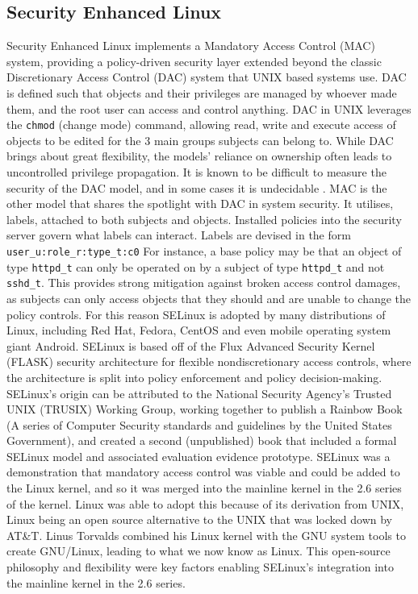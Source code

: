 \documentclass[11pt,titlepage,dvipsnames,table,xcdraw]{article}
\begin{document}
\subsection{Security Enhanced Linux}
Security Enhanced Linux implements a Mandatory Access Control (MAC) system, providing a policy-driven security layer extended beyond the classic
Discretionary Access Control (DAC) system that UNIX based systems use. DAC is defined such that objects and their privileges are managed by whoever made them, and the root user can access and 
control anything. DAC in UNIX leverages the \verb_chmod_ (change mode) command, allowing read, write and execute access of objects to be edited for the 3 main groups subjects can belong to. While DAC brings about great
flexibility, the models' reliance on ownership often leads to uncontrolled privilege propagation. It is known to be difficult to measure the security of the DAC model, and in some cases it is undecidable \cite{fan_mandatory_2009}. 
MAC is the other model that shares the spotlight with DAC in system security. It utilises, labels, attached to both subjects and objects. Installed policies into the security server govern what labels can interact.
Labels are devised in the form \verb|user_u:role_r:type_t:c0|
For instance, a base policy may be that an object of type \verb|httpd_t| can only be operated on by a subject of 
type \verb|httpd_t| and not \verb|sshd_t|. This provides strong mitigation against
broken access control damages, as subjects can only access objects that they should and are unable to change the policy controls. For this reason SELinux is adopted by many distributions of Linux, including Red Hat,
Fedora, CentOS and even mobile operating system giant Android. SELinux is based off of the Flux Advanced Security Kernel (FLASK) security architecture for flexible
nondiscretionary access controls, where the architecture is split into policy enforcement and policy decision-making. 
SELinux's origin can be attributed to the National Security Agency's Trusted UNIX (TRUSIX) Working Group, working together to publish a Rainbow Book (A series of Computer Security standards and guidelines
by the United States Government), and created a second (unpublished) book that included a formal SELinux model and associated evaluation evidence prototype. SELinux was a demonstration that mandatory access
control was viable and could be added to the Linux kernel, and so it was merged into the mainline kernel in the 2.6 series of the kernel. Linux was able to adopt this because of its derivation from UNIX, Linux
being an open source alternative to the UNIX that was locked down by AT&T. Linus Torvalds combined his Linux kernel with the GNU system tools to create GNU/Linux, leading to what we now know as Linux. This open-source
philosophy and flexibility were key factors enabling SELinux's integration into the mainline kernel in the 2.6 series.
\end{document}
